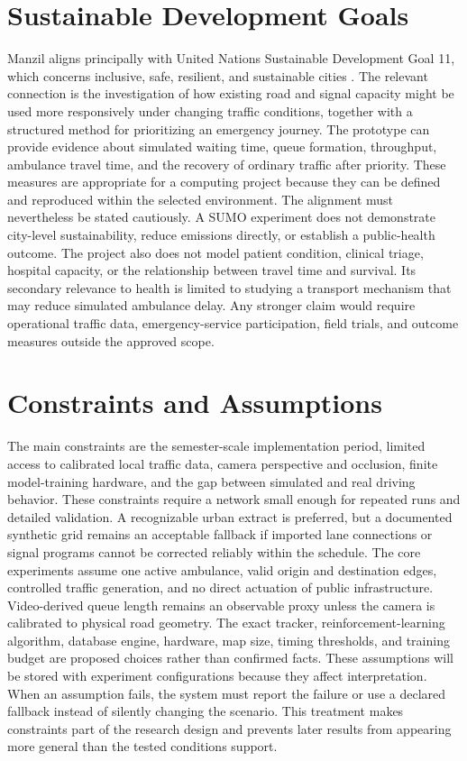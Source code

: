 \section{Sustainable Development Goals}

Manzil aligns principally with United Nations Sustainable Development Goal 11, which concerns inclusive, safe, resilient, and sustainable cities \cite{un2025sdg}. The relevant connection is the investigation of how existing road and signal capacity might be used more responsively under changing traffic conditions, together with a structured method for prioritizing an emergency journey. The prototype can provide evidence about simulated waiting time, queue formation, throughput, ambulance travel time, and the recovery of ordinary traffic after priority. These measures are appropriate for a computing project because they can be defined and reproduced within the selected environment. The alignment must nevertheless be stated cautiously. A SUMO experiment does not demonstrate city-level sustainability, reduce emissions directly, or establish a public-health outcome. The project also does not model patient condition, clinical triage, hospital capacity, or the relationship between travel time and survival. Its secondary relevance to health is limited to studying a transport mechanism that may reduce simulated ambulance delay. Any stronger claim would require operational traffic data, emergency-service participation, field trials, and outcome measures outside the approved scope.

\section{Constraints and Assumptions}

The main constraints are the semester-scale implementation period, limited access to calibrated local traffic data, camera perspective and occlusion, finite model-training hardware, and the gap between simulated and real driving behavior. These constraints require a network small enough for repeated runs and detailed validation. A recognizable urban extract is preferred, but a documented synthetic grid remains an acceptable fallback if imported lane connections or signal programs cannot be corrected reliably within the schedule. The core experiments assume one active ambulance, valid origin and destination edges, controlled traffic generation, and no direct actuation of public infrastructure. Video-derived queue length remains an observable proxy unless the camera is calibrated to physical road geometry. The exact tracker, reinforcement-learning algorithm, database engine, hardware, map size, timing thresholds, and training budget are proposed choices rather than confirmed facts. These assumptions will be stored with experiment configurations because they affect interpretation. When an assumption fails, the system must report the failure or use a declared fallback instead of silently changing the scenario. This treatment makes constraints part of the research design and prevents later results from appearing more general than the tested conditions support.

